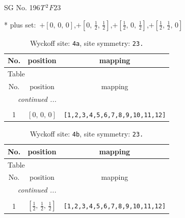 \documentclass[fleqn,8pt]{jsarticle}
\begin{document}
\setcounter{MaxMatrixCols}{32}

\renewcommand{\tablename}{Table~}
\renewcommand{\figurename}{Figure~}
\begin{center}
\LARGE
SG No. 196\quad$T_{\rm }^{2}$\quad$F23$\quad[ cubic ]
\end{center}
* plus set:\,\,\,$+\left[ 0,\, 0,\, 0 \right]$,\quad $+\left[ 0,\, \frac{1}{2},\, \frac{1}{2} \right]$,\quad $+\left[ \frac{1}{2},\, 0,\, \frac{1}{2} \right]$,\quad $+\left[ \frac{1}{2},\, \frac{1}{2},\, 0 \right]$
\renewcommand{\arraystretch}{1.2}
\begin{longtable}{ccc}
\caption{Wyckoff site: {\tt 4a}, site symmetry: {\tt 23.}}
 \\
 \hline \hline
No. & position & mapping \\ \hline \endfirsthead

\multicolumn{2}{l}{\tablename\ \thetable{}} \\
 \hline \hline
No. & position & mapping \\ \hline \endhead

 \hline \hline
\multicolumn{2}{r}{\footnotesize\it continued ...} \\ \endfoot

 \hline \hline
\multicolumn{2}{r}{} \\ \endlastfoot

1 & $\left[ 0,\, 0,\, 0 \right]$ & {\tt [1,2,3,4,5,6,7,8,9,10,11,12]} \\
\end{longtable}
\renewcommand{\arraystretch}{1.2}
\begin{longtable}{ccc}
\caption{Wyckoff site: {\tt 4b}, site symmetry: {\tt 23.}}
 \\
 \hline \hline
No. & position & mapping \\ \hline \endfirsthead

\multicolumn{2}{l}{\tablename\ \thetable{}} \\
 \hline \hline
No. & position & mapping \\ \hline \endhead

 \hline \hline
\multicolumn{2}{r}{\footnotesize\it continued ...} \\ \endfoot

 \hline \hline
\multicolumn{2}{r}{} \\ \endlastfoot

1 & $\left[ \frac{1}{2},\, \frac{1}{2},\, \frac{1}{2} \right]$ & {\tt [1,2,3,4,5,6,7,8,9,10,11,12]} \\
\end{longtable}
\end{document}
